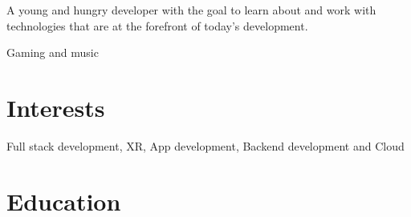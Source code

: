 \documentclass[letterpaper]{twentysecondcv} %
\begin{document}

\aboutme
{
	A young and hungry developer with the goal to learn about and work with 			technologies that are at the forefront of today's development.
} %




\hobbies
{
	Gaming and music
}


\skillstext{}


\makeprofile %


\section{Interests}

Full stack development, XR, App development, Backend development and Cloud


\section{Education}
\end{document}
